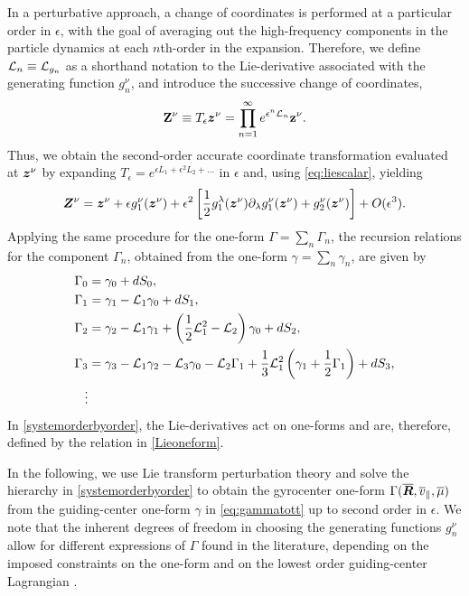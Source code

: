 In a perturbative approach, a change of coordinates is performed at a particular order in $\epsilon$, with the goal of averaging out the high-frequency components in the particle dynamics at each $n$th-order in the expansion.
%
Therefore, we define $\mathcal{L}_{n} \equiv \mathcal{L}_{g_n}$ as a shorthand notation to the Lie-derivative associated with the generating function $g_n^\nu$, and introduce the successive change of coordinates,
%
\begin{equation}
    \mathbf {\bm{Z}}^\nu  \equiv T_{\epsilon} \bm{z}^{\nu} = \prod_{n=1}^{\infty} e^{ \epsilon^n  \mathcal{L}_{n} } \mathbf z^\nu.
\end{equation}
%
Thus, we obtain the second-order accurate coordinate transformation evaluated at $\bm{z}^\nu$ by expanding $T_{\epsilon}=e^{\epsilon L_1+\epsilon^2 L_2+...}$ in $\epsilon$ and, using \cref{eq:liescalar}, yielding
%
\begin{equation} \label{Znu}
  \bm{Z}^{\nu}  = \bm{z}^{\nu} + \epsilon g_1^\nu(\bm{z}^{\nu}) + \epsilon^2 \left[ \frac{1}{2}g_1^\lambda(\bm{z}^{\nu}) \partial_\lambda g_1^\nu(\bm{z}^{\nu})  + g_2^\nu(\bm{z}^{\nu}) \right] + O(\epsilon^3).
\end{equation}
%
Applying the same procedure for the one-form $\Gamma = \sum_{n} \Gamma_n$, the recursion relations for the component $\Gamma_n$, obtained from the one-form $\gamma = \sum_n \gamma_n$, are given by
%
\begin{subequations}
\label{systemorderbyorder}
\begin{align}
\Gamma_0 &= \gamma_0 + d S_0, \label{systemorderbyorder0}\\
\Gamma_1 &= \gamma_1 - \mathcal{L}_1 \gamma_0 + d S_1 , \label{systemorderbyorder1} \\
\Gamma_2 &= \gamma_2 - \mathcal{L}_1 \gamma_1  + \left( \frac{1}{2} \mathcal{L}_1^2 - \mathcal{L}_2\right) \gamma_0 + d S_2, \label{systemorderbyorder2} \\
\Gamma_3 & = \gamma_3 - \mathcal{L}_1 \gamma_2 - \mathcal{L}_3 \gamma_0 - \mathcal{L}_2 \Gamma_1 + \frac{1}{3} \mathcal{L}_1^2\left( \gamma_1 + \frac{1}{2} \Gamma_1 \right) + d S_3,  \label{systemorderbyorder3}\\
\vdots \nonumber 
\end{align}
\end{subequations}
%
In \cref{systemorderbyorder}, the Lie-derivatives act on one-forms and are, therefore, defined by the relation in \cref{Lieoneform}.
 
In the following, we use Lie transform perturbation theory and solve the hierarchy in \cref{systemorderbyorder} to obtain the gyrocenter one-form ${\Gamma}(\overline{\bm{R}},  \overline{v}_{\parallel},\overline{\mu})$ from the guiding-center one-form $\gamma$ in \cref{eq:gammatott} up to second order in $\epsilon$.
%
We note that the inherent degrees of freedom in choosing the generating functions $g^\nu_n$ allow for different expressions of $\Gamma$ found in the literature, depending on the imposed constraints on the one-form and on the lowest order guiding-center Lagrangian \citep[see, e.g.,][]{Brizard2007a,Hahm2009,Dimits2012,Tronko2016}.

